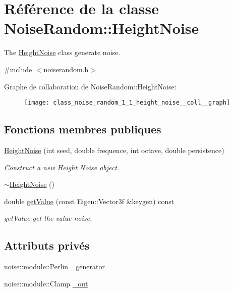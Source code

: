 \hypertarget{class_noise_random_1_1_height_noise}{}\section{Référence de la classe Noise\+Random\+:\+:Height\+Noise}
\label{class_noise_random_1_1_height_noise}


The \hyperlink{class_noise_random_1_1_height_noise}{Height\+Noise} class generate noise.  




{\ttfamily \#include $<$noiserandom.\+h$>$}



Graphe de collaboration de Noise\+Random\+:\+:Height\+Noise\+:\nopagebreak
\begin{figure}[H]
\begin{center}
\leavevmode
\texttt{[image: class\_noise\_random\_1\_1\_height\_noise\_\_coll\_\_graph]}
\end{center}
\end{figure}
\subsection*{Fonctions membres publiques}
\begin{DoxyCompactItemize}
\item 
\hyperlink{class_noise_random_1_1_height_noise_ab166c1a0af9e801a289d33a6d7bd2292}{Height\+Noise} (int seed, double frequence, int octave, double persistence)
\begin{DoxyCompactList}\small\item\em Construct a new Height Noise object. \end{DoxyCompactList}\item 
\hyperlink{class_noise_random_1_1_height_noise_a85d91613d7cc310e928f136680afff22}{$\sim$\+Height\+Noise} ()
\item 
double \hyperlink{class_noise_random_1_1_height_noise_a2fd30f88b20ba463d156c210ef08d54e}{get\+Value} (const Eigen\+::\+Vector3f \&keygen) const
\begin{DoxyCompactList}\small\item\em get\+Value get the value noise. \end{DoxyCompactList}\end{DoxyCompactItemize}
\subsection*{Attributs privés}
\begin{DoxyCompactItemize}
\item 
noise\+::module\+::\+Perlin \hyperlink{class_noise_random_1_1_height_noise_a537d769e59cef8e6691238c9f838510f}{\+\_\+generator}
\item 
noise\+::module\+::\+Clamp \hyperlink{class_noise_random_1_1_height_noise_a5e4713b2a4522778d1478cdf75339658}{\+\_\+out}
\end{DoxyCompactItemize}


